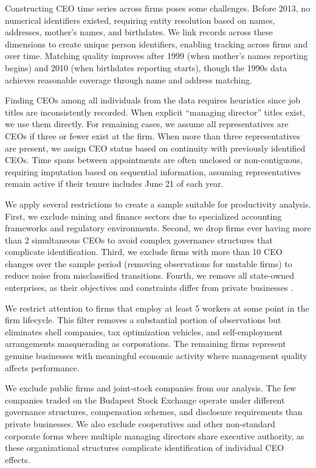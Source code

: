 \documentclass[11pt,a4paper]{article}
\begin{document}
Constructing CEO time series across firms poses some challenges. Before 2013, no numerical identifiers existed, requiring entity resolution based on names, addresses, mother's names, and birthdates. We link records across these dimensions to create unique person identifiers, enabling tracking across firms and over time. Matching quality improves after 1999 (when mother's names reporting begins) and 2010 (when birthdates reporting starts), though the 1990s data achieves reasonable coverage through name and address matching. 

Finding CEOs among all individuals from the data requires heuristics since job titles are inconsistently recorded. When explicit ``managing director'' titles exist, we use them directly. For remaining cases, we assume all representatives are CEOs if three or fewer exist at the firm. When more than three representatives are present, we assign CEO status based on continuity with previously identified CEOs. Time spans between appointments are often unclosed or non-contiguous, requiring imputation based on sequential information, assuming representatives remain active if their tenure includes June 21 of each year.

We apply several restrictions to create a sample suitable for productivity analysis. First, we exclude mining and finance sectors due to specialized accounting frameworks and regulatory environments. Second, we drop firms ever having more than 2 simultaneous CEOs to avoid complex governance structures that complicate identification. Third, we exclude firms with more than 10 CEO changes over the sample period (removing observations for unstable firms) to reduce noise from misclassified transitions. Fourth, we remove all state-owned enterprises, as their objectives and constraints differ from private businesses \citep{orban2019inception, shleifer1994politicians}.

We restrict attention to firms that employ at least 5 workers at some point in the firm lifecycle. This filter removes a substantial portion of observations but eliminates shell companies, tax optimization vehicles, and self-employment arrangements masquerading as corporations. The remaining firms represent genuine businesses with meaningful economic activity where management quality affects performance.

We exclude public firms and joint-stock companies from our analysis. The few companies traded on the Budapest Stock Exchange operate under different governance structures, compensation schemes, and disclosure requirements than private businesses. We also exclude cooperatives and other non-standard corporate forms where multiple managing directors share executive authority, as these organizational structures complicate identification of individual CEO effects.
\end{document}
